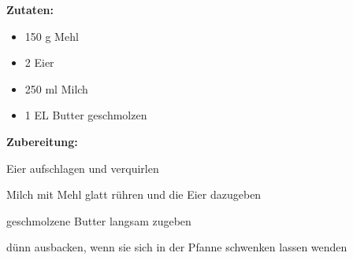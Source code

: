 

\textbf {Zutaten:} \\
\begin{itemize}
	\item 150 g Mehl
	\item 2 Eier
	\item 250 ml Milch
	\item 1 EL Butter geschmolzen
\end{itemize}

\vspace* {2cm}

\textbf {Zubereitung:} \\
\begin{compactenum}
	\item Eier aufschlagen und verquirlen
	\item Milch mit Mehl glatt rühren und die Eier dazugeben
	\item geschmolzene Butter langsam zugeben
	\item dünn ausbacken, wenn sie sich in der Pfanne schwenken lassen wenden
\end{compactenum}


